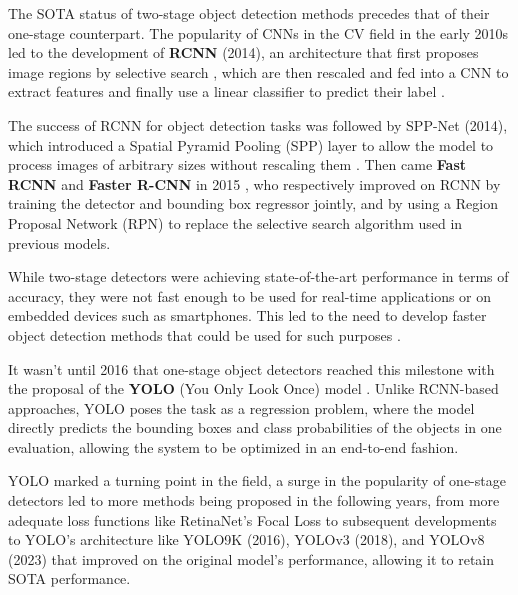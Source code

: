 \documentclass[../main.tex]{subfiles}
\begin{document}
    The SOTA status of two-stage object detection methods precedes that of their one-stage counterpart. The popularity of CNNs in the CV field in the early 2010s led to the development of \textbf{RCNN} (2014), an architecture that first proposes image regions by selective search \cite{uijlingsSelectiveSearchObject2013}, which are then rescaled and fed into a CNN to extract features and finally use a linear classifier to predict their label \cite{girshickRichFeatureHierarchies2014}. 
    
    The success of RCNN for object detection tasks was followed by SPP-Net (2014), which introduced a Spatial Pyramid Pooling (SPP) layer to allow the model to process images of arbitrary sizes without rescaling them \cite{heSpatialPyramidPooling2014}. Then came \textbf{Fast RCNN} and \textbf{Faster R-CNN} in 2015 \cite{girshickFastRCNN2015,renFasterRCNNRealTime2016}, who respectively improved on RCNN by training the detector and bounding box regressor jointly, and by using a Region Proposal Network (RPN) to replace the selective search algorithm used in previous models. 
    
    While two-stage detectors were achieving state-of-the-art performance in terms of accuracy, they were not fast enough to be used for real-time applications or on embedded devices such as smartphones. This led to the need to develop faster object detection methods that could be used for such purposes \cite{zouObjectDetection202023b}.
    
    It wasn't until 2016 that one-stage object detectors reached this milestone with the proposal of the \textbf{YOLO} (You Only Look Once) model \cite{redmonYouOnlyLook2016}. Unlike RCNN-based approaches, YOLO poses the task as a regression problem, where the model directly predicts the bounding boxes and class probabilities of the objects in one evaluation, allowing the system to be optimized in an end-to-end fashion. 

     YOLO marked a turning point in the field, a surge in the popularity of one-stage detectors led to more methods being proposed in the following years, from more adequate loss functions like RetinaNet's Focal Loss \cite{linFocalLossDense2018} to subsequent developments to YOLO's architecture like YOLO9K (2016), YOLOv3 (2018), and YOLOv8 (2023) \cite{redmonYOLO9000BetterFaster2016, redmonYOLOv3IncrementalImprovement2018, Jocher_YOLO_by_Ultralytics_2023} that improved on the original model's performance, allowing it to retain SOTA performance.
     
\end{document}
